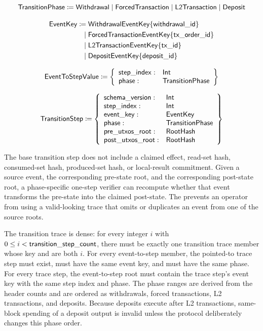 \documentclass[../midgard.tex]{subfiles}
\begin{document}
\begin{equation*}
    \mathsf{TransitionPhase} \coloneq
        \mathsf{Withdrawal}
        \mid \mathsf{ForcedTransaction}
        \mid \mathsf{L2Transaction}
        \mid \mathsf{Deposit}
\end{equation*}

\begin{align*}
    \mathsf{EventKey} \coloneq\;&
        \mathsf{WithdrawalEventKey}\{\mathsf{withdrawal\_id}\} \\
        \mid\;& \mathsf{ForcedTransactionEventKey}\{\mathsf{tx\_order\_id}\} \\
        \mid\;& \mathsf{L2TransactionEventKey}\{\mathsf{tx\_id}\} \\
        \mid\;& \mathsf{DepositEventKey}\{\mathsf{deposit\_id}\}
\end{align*}

\begin{equation*}
    \mathsf{EventToStepValue} \coloneq \left\{
    \begin{array}{ll}
        \mathsf{step\_index} : & \mathsf{Int} \\
        \mathsf{phase} : & \mathsf{TransitionPhase}
    \end{array} \right\}
\end{equation*}

\begin{equation*}
    \mathsf{TransitionStep} \coloneq \left\{
    \begin{array}{ll}
        \mathsf{schema\_version} : & \mathsf{Int} \\
        \mathsf{step\_index} : & \mathsf{Int} \\
        \mathsf{event\_key} : & \mathsf{EventKey} \\
        \mathsf{phase} : & \mathsf{TransitionPhase} \\
        \mathsf{pre\_utxos\_root} : & \mathsf{RootHash} \\
        \mathsf{post\_utxos\_root} : & \mathsf{RootHash}
    \end{array} \right\}
\end{equation*}

The base transition step does not include a claimed effect, read-set hash, consumed-set hash, produced-set hash, or local-result commitment.
Given a source event, the corresponding pre-state root, and the corresponding post-state root, a phase-specific one-step verifier can recompute whether that event transforms the pre-state into the claimed post-state.
The  prevents an operator from using a valid-looking trace that omits or duplicates an event from one of the source roots.

The transition trace is dense: for every integer \(i\) with \(0 \leq i < \mathsf{transition\_step\_count}\), there must be exactly one transition trace member whose key and  are both \(i\).
For every event-to-step member, the pointed-to trace step must exist, must have the same event key, and must have the same phase.
For every trace step, the event-to-step root must contain the trace step's event key with the same step index and phase.
The phase ranges are derived from the header counts and are ordered as withdrawals, forced transactions, L2 transactions, and deposits.
Because deposits execute after L2 transactions, same-block spending of a deposit output is invalid unless the protocol deliberately changes this phase order.
\end{document}
